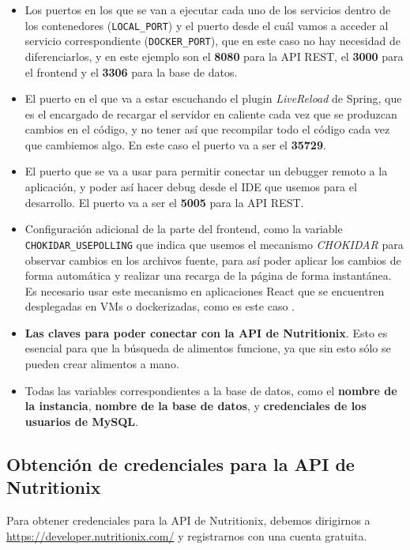 \begin{itemize}
	\item Los puertos en los que se van a ejecutar cada uno de los servicios dentro de los contenedores (\verb,LOCAL_PORT,) y el puerto desde el cuál vamos a acceder al servicio correspondiente (\verb,DOCKER_PORT,), que en este caso no hay necesidad de diferenciarlos, y en este ejemplo son el \textbf{8080} para la API REST, el \textbf{3000} para el frontend y el \textbf{3306} para la base de datos.
	\item El puerto en el que va a estar escuchando el plugin \textit{LiveReload} de Spring, que es el encargado de recargar el servidor en caliente cada vez que se produzcan cambios en el código, y no tener así que recompilar todo el código cada vez que cambiemos algo. En este caso el puerto va a ser el \textbf{35729}.
	\item El puerto que se va a usar para permitir conectar un debugger remoto a la aplicación, y poder así hacer debug desde el IDE que usemos para el desarrollo. El puerto va a ser el \textbf{5005} para la API REST.
	\item Configuración adicional de la parte del frontend, como la variable \verb,CHOKIDAR_USEPOLLING, que indica que usemos el mecanismo \textit{CHOKIDAR} para observar cambios en los archivos fuente, para así poder aplicar los cambios de forma automática y realizar una recarga de la página de forma instantánea. Es necesario usar este mecanismo en aplicaciones React que se encuentren desplegadas en VMs o dockerizadas, como es este caso \cite{create-react-app:advanced-conf}.
	\item \textbf{Las claves para poder conectar con la API de Nutritionix}. Esto es esencial para que la búsqueda de alimentos funcione, ya que sin esto sólo se pueden crear alimentos a mano.
	\item Todas las variables correspondientes a la base de datos, como el \textbf{nombre de la instancia}, \textbf{nombre de la base de datos}, y \textbf{credenciales de los usuarios de MySQL}.
\end{itemize}

\subsection{Obtención de credenciales para la API de Nutritionix}

Para obtener credenciales para la API de Nutritionix, debemos dirigirnos a \href{https://developer.nutritionix.com/}{https://developer.nutritionix.com/} y registrarnos con una cuenta gratuita.

